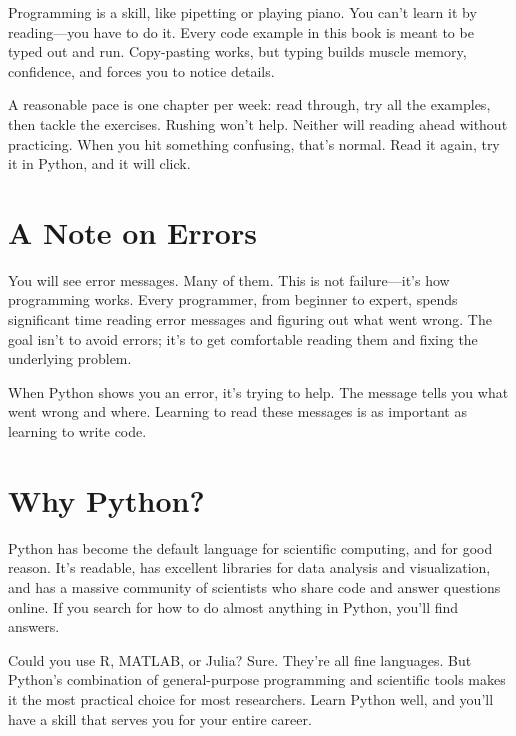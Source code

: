 Programming is a skill, like pipetting or playing piano. You can't learn it by reading---you have to do it. Every code example in this book is meant to be typed out and run. Copy-pasting works, but typing builds muscle memory, confidence, and forces you to notice details.

A reasonable pace is one chapter per week: read through, try all the examples, then tackle the exercises. Rushing won't help. Neither will reading ahead without practicing. When you hit something confusing, that's normal. Read it again, try it in Python, and it will click.

\section*{A Note on Errors}

You will see error messages. Many of them. This is not failure---it's how programming works. Every programmer, from beginner to expert, spends significant time reading error messages and figuring out what went wrong. The goal isn't to avoid errors; it's to get comfortable reading them and fixing the underlying problem.

When Python shows you an error, it's trying to help. The message tells you what went wrong and where. Learning to read these messages is as important as learning to write code.

\section*{Why Python?}

Python has become the default language for scientific computing, and for good reason. It's readable, has excellent libraries for data analysis and visualization, and has a massive community of scientists who share code and answer questions online. If you search for how to do almost anything in Python, you'll find answers.

Could you use R, MATLAB, or Julia? Sure. They're all fine languages. But Python's combination of general-purpose programming and scientific tools makes it the most practical choice for most researchers. Learn Python well, and you'll have a skill that serves you for your entire career.
